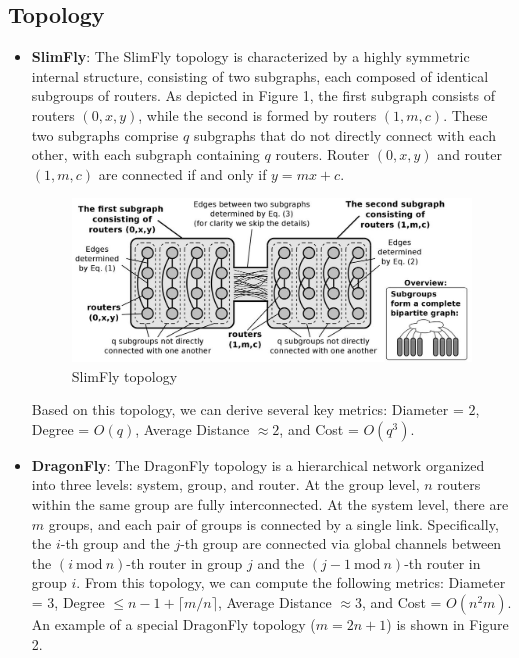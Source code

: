 \documentclass[utf8]{article}
\begin{document}
\subsection{Topology}
\begin{itemize}
    \item \textbf{SlimFly}: The SlimFly topology is characterized by a highly symmetric internal structure, consisting of two subgraphs, each composed of identical subgroups of routers. As depicted in Figure 1, the first subgraph consists of routers \((0,x,y)\), while the second is formed by routers \((1,m,c)\). These two subgraphs comprise \(q\) subgraphs that do not directly connect with each other, with each subgraph containing \(q\) routers. Router $(0, x, y)$ and router $(1, m, c)$ are connected if and only if $y = mx + c$.

    \begin{figure}[h]
        \centering
        \includegraphics[width=0.7\linewidth]{SlimFly.png}
        \caption{SlimFly topology}
    \end{figure}

    Based on this topology, we can derive several key metrics: Diameter = \(2\), Degree = \(O(q)\), Average Distance \(\approx 2\), and Cost = \(O(q^3)\).

    \item \textbf{DragonFly}: The DragonFly topology is a hierarchical network organized into three levels: system, group, and router. At the group level, \(n\) routers within the same group are fully interconnected. At the system level, there are \(m\) groups, and each pair of groups is connected by a single link. Specifically, the \(i\)-th group and the \(j\)-th group are connected via global channels between the \((i \mathrm{~mod~} n)\)-th router in group \(j\) and the \((j-1 \mathrm{~mod~} n)\)-th router in group \(i\). From this topology, we can compute the following metrics: Diameter = \(3\), Degree \(\le n-1+\lceil m/n\rceil\), Average Distance \(\approx 3\), and Cost = \(O(n^2m)\). An example of a special DragonFly topology (\(m=2n+1\)) is shown in Figure 2.


\end{itemize}
\end{document}
